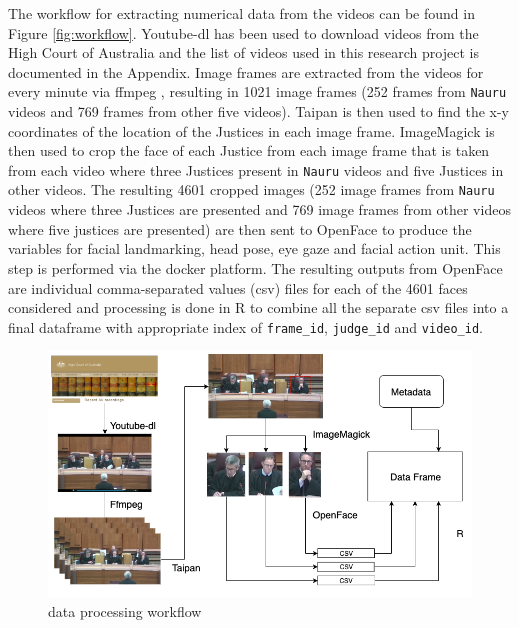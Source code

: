 \documentclass{monashthesis}
\begin{document}
The workflow for extracting numerical data from the videos can be found in Figure \ref{fig:workflow}. Youtube-dl \autocite{youtube-dl} has been used to download videos from the High Court of Australia\autocite{highcourtau} and the list of videos used in this research project is documented in the Appendix. Image frames are extracted from the videos for every minute via ffmpeg \autocite{ffmpeg}, resulting in 1021 image frames (252 frames from \texttt{Nauru} videos and 769 frames from other five videos). Taipan \autocite{Taipan} is then used to find the x-y coordinates of the location of the Justices in each image frame. ImageMagick \autocite{ImageMagick} is then used to crop the face of each Justice from each image frame that is taken from each video where three Justices present in \texttt{Nauru} videos and five Justices in other videos. The resulting 4601 cropped images (252 image frames from \texttt{Nauru} videos where three Justices are presented and 769 image frames from other videos where five justices are presented) are then sent to OpenFace \autocite{baltrusaitis2018openface} to produce the variables for facial landmarking, head pose, eye gaze and facial action unit. This step is performed via the docker platform. The resulting outputs from OpenFace are individual comma-separated values (csv) files for each of the 4601 faces considered and processing is done in R to combine all the separate csv files into a final dataframe with appropriate index of \texttt{frame\_id}, \texttt{judge\_id} and \texttt{video\_id}.

\begin{figure}
\includegraphics[width=1\linewidth]{figures/workflow} \caption{data processing workflow \label{fig:workflow}}\label{fig:unnamed-chunk-1}
\end{figure}
\end{document}
